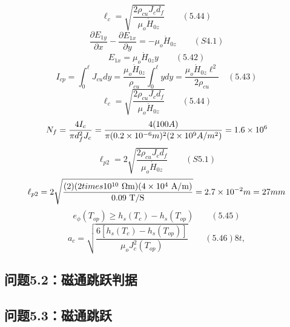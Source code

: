 \begin{equation}%
\ell_{c}=\sqrt{\frac{2\rho_{cu}J_{c}d_{f}}{\mu_{o}\dot{H}_{0z}}}\qquad(5.44)
\end{equation}
\begin{equation}%
\frac{\partial E_{1y}}{\partial x}-\frac{\partial E_{1x}}{\partial y}=-\mu_{o}\dot{H}_{0z}\qquad(S4.1)
\end{equation}
\begin{equation}%
E_{1x}=\mu_{o}\dot{H}_{0z}y\qquad(5.42)
\end{equation}
\begin{equation}%
I_{cp}=\int_{0}^{\ell}J_{cu}dy=\frac{\mu_{o}\dot{H}_{0z}}{\rho_{cu}}\int_{0}^{\ell}ydy=\frac{\mu_{o}\dot{H}_{0z}\ell^{2}}{2\rho_{cu}}\quad(5.43)
\end{equation}
\begin{equation}%
\ell_{c}=\sqrt{\frac{2\rho_{cu}J_{c}d_{f}}{\mu_{o}\dot{H}_{0z}}}\qquad(5.44)
\end{equation}
\begin{equation}%
N_{f}=\frac{4I_{c}}{\pi d_{f}^{2}J_{c}}=\frac{4(100A)}{\pi(0.2\times10^{-6}m)^{2}(2\times10^{9}A/m^{2})}\\
=1.6\times10^{6}
\end{equation}
\begin{equation}%
\ell_{p2}=2\sqrt{\frac{2\rho_{cu}J_{c}d_{f}}{\mu_{o}\dot{H}_{0z}}}\qquad(S5.1)
\end{equation}
\begin{equation}%
\ell_{p2}=2\sqrt{\frac{(2)(2\\times10^{10}\ \mathrm{\Omega m})(4\times10^{4}\ \mathrm{A/m})}{0.09\ \mathrm{T/S}}}\\
=2.7\times10^{-2}m=27mm
\end{equation}
\begin{equation}%
e_{\phi}(T_{op})\geq h_{s}(T_{c})-h_{s}(T_{op})\qquad(5.45)
\end{equation}
\begin{equation}%
a_{c}=\sqrt{\frac{6[h_{s}(T_{c})-h_{s}(T_{op})]}{\mu_{o}J_{c}^{2}(T_{op})}}\qquad(5.46)8t, 
\end{equation}

\subsection{问题5.2：磁通跳跃判据}


\subsection{问题5.3：磁通跳跃}


